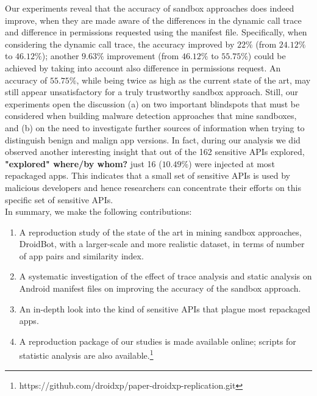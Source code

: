Our experiments reveal that the accuracy of sandbox approaches does indeed improve, when they are made aware of the differences in the dynamic call trace and difference in permissions requested using the manifest file. Specifically, when considering the dynamic call trace, the accuracy improved by $22\%$ (from $24.12\%$ to $46.12\%$); another $9.63\%$ improvement (from $46.12\%$ to $55.75\%$) could be achieved by taking into account also difference in permissions request. An accuracy of $55.75\%$, while being twice as high as the current state of the art, may still appear unsatisfactory for a truly trustworthy sandbox approach. Still, 
our experiments open the discussion (a) on two important blindspots that must be considered when building 
malware detection approaches that mine sandboxes, and (b) on the need to investigate further sources of information when trying to distinguish benign and malign app versions. 
In fact, during our analysis we did observed another interesting insight that out of the 162 sensitive 
APIs explored, \textbf{"explored" where/by whom?} just 16 ($10.49$\%) were injected at most repackaged apps. 
This indicates that a small set of sensitive APIs is used by malicious developers and hence 
researchers can concentrate their efforts on this specific set of sensitive APIs.\\


\noindent
In summary, we make the following contributions:

\begin{enumerate}[1.]
\item A reproduction study of the state of the art in mining sandbox approaches, DroidBot, 
with a larger-scale and more realistic dataset, in terms of number of app pairs and similarity index.
\item A systematic investigation of the effect of trace analysis and static analysis on Android manifest files 
on improving the accuracy of the sandbox approach.
\item An in-depth look into the kind of sensitive APIs that plague most repackaged apps.
\item A reproduction package of our studies is made available online; scripts for statistic analysis are also available.\footnote{https://github.com/droidxp/paper-droidxp-replication.git}
\end{enumerate}


